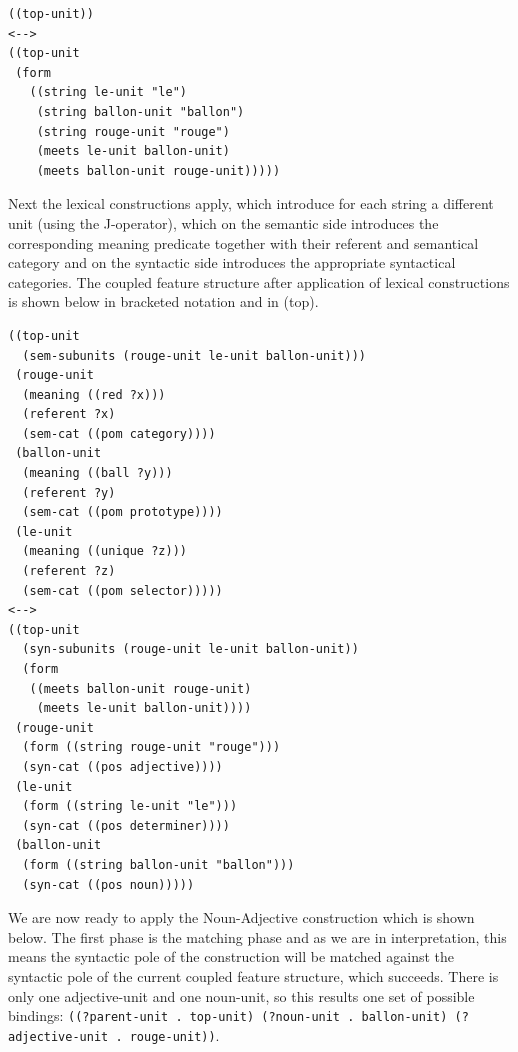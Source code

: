 \footnotesize
{}
\begin{lstlisting}
((top-unit))
<-->
((top-unit
 (form
   ((string le-unit "le")
    (string ballon-unit "ballon")
    (string rouge-unit "rouge")
    (meets le-unit ballon-unit)
    (meets ballon-unit rouge-unit)))))
\end{lstlisting}
\normalsize

Next the lexical constructions apply, which introduce for each string
a different unit (using the J-operator), which on the semantic side
introduces the corresponding meaning predicate together with their
referent and semantical category and on the syntactic side introduces
the appropriate syntactical categories. The coupled feature structure
after application of lexical constructions is shown below in bracketed
notation and in  (top).

\footnotesize
{}
\begin{lstlisting}
((top-unit
  (sem-subunits (rouge-unit le-unit ballon-unit)))
 (rouge-unit
  (meaning ((red ?x)))
  (referent ?x)
  (sem-cat ((pom category))))
 (ballon-unit
  (meaning ((ball ?y)))
  (referent ?y)
  (sem-cat ((pom prototype))))
 (le-unit
  (meaning ((unique ?z)))
  (referent ?z)
  (sem-cat ((pom selector)))))
<-->
((top-unit
  (syn-subunits (rouge-unit le-unit ballon-unit))
  (form
   ((meets ballon-unit rouge-unit) 
    (meets le-unit ballon-unit))))
 (rouge-unit
  (form ((string rouge-unit "rouge")))
  (syn-cat ((pos adjective))))
 (le-unit 
  (form ((string le-unit "le"))) 
  (syn-cat ((pos determiner))))
 (ballon-unit
  (form ((string ballon-unit "ballon")))
  (syn-cat ((pos noun)))))
\end{lstlisting}
\normalsize

We are now ready to apply the Noun-Adjective construction which is
shown below. The first phase is the matching phase and as we are in
interpretation, this means the syntactic pole of the construction will
be matched against the syntactic pole of the current coupled feature
structure, which succeeds. There is only one adjective-unit and one
noun-unit, so this results one set of possible bindings:
{\footnotesize\tt ((?parent-unit . top-unit) (?noun-unit . ballon-unit)
  (?adjective-unit . rouge-unit))}.

